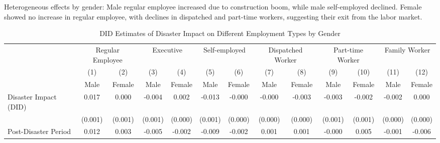 \documentclass[serif, aspectratio=169]{beamer}
\begin{document}
\begin{frame}


Heterogeneous effects by gender: Male regular employee increased due to construction boom, while male self-employed declined. Female showed no increase in regular employee, with declines in dispatched and part-time workers, suggesting their exit from the labor market.


\begin{table}[htbp]
\centering
\caption{DID Estimates of Disaster Impact on Different Employment Types by Gender}

\vspace{-0.1cm}



\begin{tabular}{@{}l*{12}{c}@{}}
          &\multicolumn{2}{c}{Regular Employee} &\multicolumn{2}{c}{Executive}        &\multicolumn{2}{c}{Self-employed}    &\multicolumn{2}{c}{Dispatched Worker}&\multicolumn{2}{c}{Part-time Worker} &\multicolumn{2}{c}{Family Worker}    \\\cmidrule(lr){2-3}\cmidrule(lr){4-5}\cmidrule(lr){6-7}\cmidrule(lr){8-9}\cmidrule(lr){10-11}\cmidrule(lr){12-13}
          &\multicolumn{1}{c}{(1)}&\multicolumn{1}{c}{(2)}&\multicolumn{1}{c}{(3)}&\multicolumn{1}{c}{(4)}&\multicolumn{1}{c}{(5)}&\multicolumn{1}{c}{(6)}&\multicolumn{1}{c}{(7)}&\multicolumn{1}{c}{(8)}&\multicolumn{1}{c}{(9)}&\multicolumn{1}{c}{(10)}&\multicolumn{1}{c}{(11)}&\multicolumn{1}{c}{(12)}\\
          &\multicolumn{1}{c}{Male}&\multicolumn{1}{c}{Female}&\multicolumn{1}{c}{Male}&\multicolumn{1}{c}{Female}&\multicolumn{1}{c}{Male}&\multicolumn{1}{c}{Female}&\multicolumn{1}{c}{Male}&\multicolumn{1}{c}{Female}&\multicolumn{1}{c}{Male}&\multicolumn{1}{c}{Female}&\multicolumn{1}{c}{Male}&\multicolumn{1}{c}{Female}\\
\toprule
Disaster Impact (DID)&    0.017\sym{***}&    0.000         &   -0.004\sym{***}&    0.002\sym{***}&   -0.013\sym{***}&   -0.000         &   -0.000         &   -0.003\sym{***}&   -0.003\sym{**} &   -0.002\sym{**} &   -0.002\sym{***}&    0.000         \\
          &  (0.001)         &  (0.001)         &  (0.001)         &  (0.000)         &  (0.001)         &  (0.000)         &  (0.000)         &  (0.000)         &  (0.001)         &  (0.001)         &  (0.000)         &  (0.000)         \\
\addlinespace
Post-Disaster Period&    0.012\sym{***}&    0.003\sym{***}&   -0.005\sym{***}&   -0.002\sym{***}&   -0.009\sym{***}&   -0.002\sym{***}&    0.001\sym{***}&    0.001\sym{***}&   -0.000         &    0.005\sym{***}&   -0.001\sym{***}&   -0.006\sym{***}\\

\end{tabular}
\end{table}
\end{frame}
\end{document}
